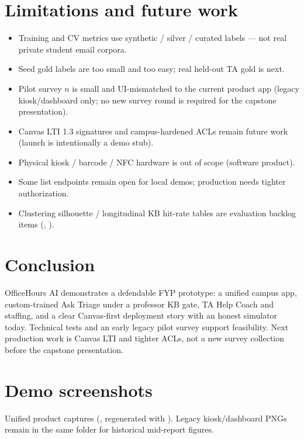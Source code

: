 \documentclass[11pt]{article}
\begin{document}
\section{Limitations and future work}
\begin{itemize}[noitemsep]
  \item Training and CV metrics use synthetic / silver / curated labels --- not
        real private student email corpora.
  \item Seed gold labels are too small and too easy; real held-out TA gold is next.
  \item Pilot survey $n$ is small and UI-mismatched to the current product app
        (legacy kiosk/dashboard only; no new survey round is required for the
        capstone presentation).
  \item Canvas LTI 1.3 signatures and campus-hardened ACLs remain future work
        (launch is intentionally a demo stub).
  \item Physical kiosk / barcode / NFC hardware is out of scope (software product).
  \item Some list endpoints remain open for local demos; production needs tighter
        authorization.
  \item Clustering silhouette / longitudinal KB hit-rate tables are evaluation
        backlog items (, ).
\end{itemize}

\section{Conclusion}
OfficeHours AI demonstrates a defendable FYP prototype: a unified campus app,
custom-trained Ask Triage under a professor KB gate, TA Help Coach and staffing,
and a clear Canvas-first deployment story with an honest simulator today.
Technical tests and an early legacy pilot survey support feasibility. Next
production work is Canvas LTI and tighter ACLs, not a new survey collection
before the capstone presentation.

\appendix
\section{Demo screenshots}
Unified product captures (, regenerated with
). Legacy kiosk/dashboard PNGs remain
in the same folder for historical mid-report figures.
\end{document}
